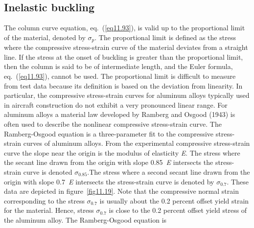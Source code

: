 \documentclass{AeroStructure-ERJohnson}
\begin{document}
\subsection{Inelastic buckling}\label{sec11.5.1}

The column curve equation, eq.~(\ref{eq11.93}), is valid up to the proportional limit of the material, denoted by $\sigma_{p}$. The proportional limit is defined as the stress where the compressive stress-strain curve of the material deviates from a straight line. If the stress at the onset of buckling is greater than the proportional limit, then the column is said to be of intermediate length, and the Euler formula, eq.~(\ref{eq11.93}), cannot be used. The proportional limit is difficult to measure from test data because its definition is based on the deviation from linearity. In particular, the compressive stress-strain curves for aluminum alloys typically used in aircraft construction do not exhibit a\vadjust{\vspace*{8pt}\pagebreak} very pronounced linear range. For aluminum alloys a material law developed by Ramberg and Osgood (1943) is often used to describe the nonlinear compressive stress-strain curve. The Ramberg-Osgood equation is a three-parameter fit to the compressive stress-strain curves of aluminum alloys. From the experimental compressive stress-strain curve the slope near the origin is the modulus of elasticity \textit{E}. The stress where the secant line drawn from the origin with slope 0.85~\textit{E} intersects the stress-strain curve is denoted $\sigma_{0.85}$.The stress where a second secant line drawn from the origin with slope 0.7~\textit{E} intersects the stress-strain curve is denoted by $\sigma_{0.7}$. These data are depicted in figure~\ref{fig11.19}. Note that the compressive normal strain corresponding to the stress $\sigma_{0.7}$ is usually about the 0.2 percent offset yield strain for the material. Hence, stress $\sigma_{0.7}$ is close to the 0.2 percent offset yield stress of the aluminum alloy. The Ramberg-Osgood equation is

\end{document}
